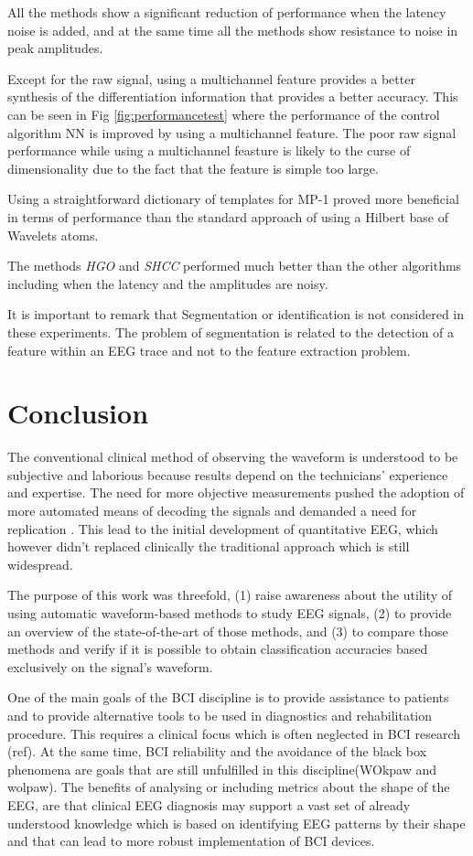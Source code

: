 \documentclass[sensors,article,submit,moreauthors,pdftex,10pt,a4paper]{mdpi}
\begin{document}
All the methods show a significant reduction of performance when the latency noise is added, and at the same time all the methods show resistance to noise in peak amplitudes.

Except for the raw signal, using a multichannel feature provides a better synthesis of the differentiation information that provides a better accuracy.  This can be seen in Fig \ref{fig:performancetest} where the performance of the control algorithm NN is improved by using a multichannel feature.  The poor raw signal performance while using a multichannel feasture is likely to the curse of dimensionality due to the fact that the feature is simple too large.

Using a straightforward dictionary of templates for MP-1 proved more beneficial in terms of performance than the standard approach of using a Hilbert base of Wavelets atoms.

The methods \textit{HGO} and \textit{SHCC} performed much better than the other algorithms including when the latency and the amplitudes are noisy.

It is important to remark that Segmentation or identification is not considered in these experiments. The  problem of segmentation is related to the detection of a feature within an EEG trace and not to the feature extraction problem.

\section{Conclusion}

The conventional clinical method of observing the waveform is understood to be subjective and laborious because results depend on the technicians' experience and expertise.  The need for more objective measurements pushed the adoption of more automated means of decoding the signals and demanded a need for replication \citep{Thakor2004}.  This lead to the initial development of quantitative EEG, which however didn't replaced clinically the traditional approach which is still widespread.

The purpose of this work was threefold, (1) raise awareness about the utility of using automatic waveform-based methods to study EEG signals, (2) to provide an overview of the state-of-the-art of those methods, and (3) to compare those methods and verify if it is possible to obtain classification accuracies based exclusively on the signal's waveform.

One of the main goals of the BCI discipline is to provide assistance to patients and to provide alternative tools to be used in diagnostics and rehabilitation procedure.  This requires a clinical focus which is often neglected in BCI research (ref).  At the same time, BCI reliability and the avoidance of the black box phenomena are goals that are still unfulfilled in this discipline(WOkpaw and wolpaw). The benefits of analysing or including metrics about the shape of the EEG, are that clinical EEG diagnosis may support a vast set of already understood knowledge which is based on identifying EEG patterns by their shape and that can lead to more robust implementation of BCI devices.
\end{document}
